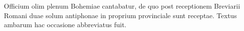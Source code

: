 Officium olim plenum Bohemiae cantabatur,
de quo post receptionem Breviarii Romani duae solum antiphonae in proprium provinciale
sunt receptae.
Textus ambarum hac occasione abbreviatus fuit.
